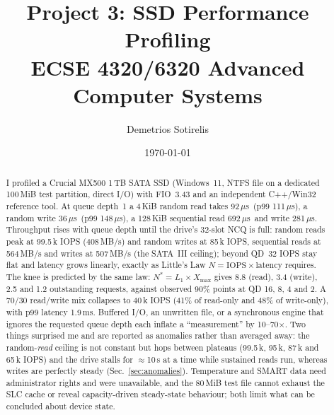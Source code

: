 ﻿\documentclass[10.5pt]{article}
\title{Project 3: SSD Performance Profiling\\[3pt]\large ECSE 4320/6320 Advanced Computer Systems}
\author{Demetrios Sotirelis}
\date{\today}
\newcommand{\us}{\,$\mu$s}
\begin{document}
\maketitle

\begin{abstract}
I profiled a Crucial MX500 1\,TB SATA SSD (Windows~11, NTFS file on a dedicated 100\,MiB test partition, direct I/O) with FIO~3.43 and an independent C++/Win32 reference tool. At queue depth~1 a 4\,KiB random read takes 92\us\ (p99 111\us), a random write 36\us\ (p99 148\us), a 128\,KiB sequential read 692\us\ and write 281\us. Throughput rises with queue depth until the drive's 32-slot NCQ is full: random reads peak at 99.5\,k IOPS (408\,MB/s) and random writes at 85\,k IOPS, sequential reads at 564\,MB/s and writes at 507\,MB/s (the SATA~III ceiling); beyond QD~32 IOPS stay flat and latency grows linearly, exactly as Little's Law $N=\text{IOPS}\times\text{latency}$ requires. The knee is predicted by the same law: $N^{*}=L_{1}\times X_{\max}$ gives 8.8 (read), 3.4 (write), 2.5 and 1.2 outstanding requests, against observed 90\% points at QD 16, 8, 4 and 2. A 70/30 read/write mix collapses to 40\,k IOPS (41\% of read-only and 48\% of write-only), with p99 latency 1.9\,ms. Buffered I/O, an unwritten file, or a synchronous engine that ignores the requested queue depth each inflate a ``measurement'' by 10--70$\times$. Two things surprised me and are reported as anomalies rather than averaged away: the random-\emph{read} ceiling is not constant but hops between plateaus (99.5\,k, 95\,k, 87\,k and 65\,k IOPS) and the drive stalls for $\approx$10\,s at a time while sustained reads run, whereas writes are perfectly steady (Sec.~\ref{sec:anomalies}). Temperature and SMART data need administrator rights and were unavailable, and the 80\,MiB test file cannot exhaust the SLC cache or reveal capacity-driven steady-state behaviour; both limit what can be concluded about device state.
\end{abstract}
\end{document}
